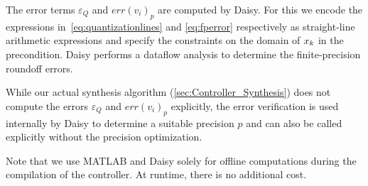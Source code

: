 

The error terms $\varepsilon_Q$ and $err(v_{i})_{p}$ are computed by Daisy. For this we encode
the expressions in~\autoref{eq:quantizationlines} and \autoref{eq:fperror}
respectively as straight-line arithmetic expressions and specify the constraints
on the domain of $x_{k}$ in the precondition.
Daisy performs a dataflow analysis to determine the finite-precision roundoff
errors. 

While our actual synthesis algorithm (\autoref{sec:Controller_Synthesis}) does
not compute the errors $\varepsilon_Q$ and $err(v_{i})_{p}$ explicitly, the
error verification is used internally by Daisy to determine a suitable precision
$p$ and can also be called explicitly without the precision optimization. 

Note that we use MATLAB and Daisy solely for offline computations during the compilation of the controller.
At runtime, there is no additional cost.

